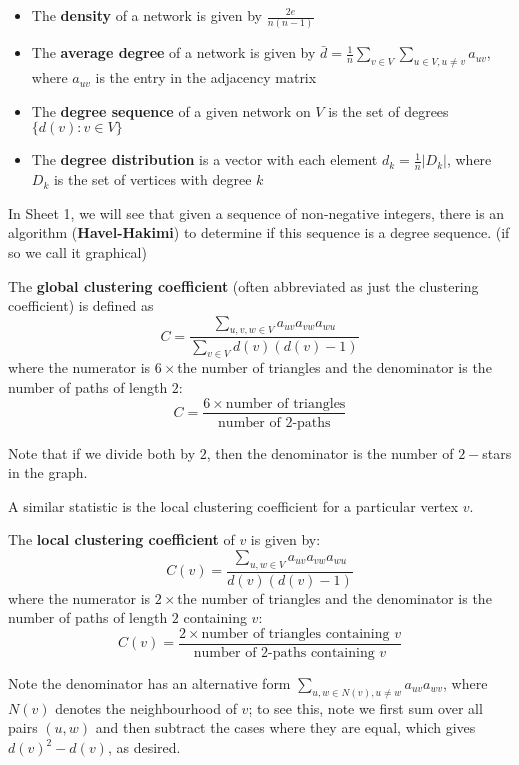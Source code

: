 \documentclass{article}
\begin{document}
\begin{itemize}
    \item  The \textbf{density} of a network is given by $\frac{2e}{n(n-1)}$
    \item The \textbf{average degree} of a network is given by $\bar{d}=\frac{1}{n}\sum_{v\in V} \sum_{u\in V, u\neq v} a_{uv}$, where $a_{uv}$ is the entry in the adjacency matrix
    \item The \textbf{degree sequence} of a given network on $V$ is the set of degrees $\{d(v): v\in V\}$
    \item The \textbf{degree distribution} is a vector with each element $d_k=\frac{1}{n} |D_k|$, where $D_k$ is the set of vertices with degree $k$
\end{itemize}
\begin{remark}
    In Sheet 1, we will see that given a sequence of non-negative integers, there is an algorithm (\textbf{Havel-Hakimi}) to determine if this sequence is a degree sequence. (if so we call it graphical)
\end{remark}

\begin{definition}
    The \textbf{global clustering coefficient} (often abbreviated as just the clustering coefficient) is defined as
    \begin{equation*}
        C = \frac{\sum_{u,v,w \in V} a_{uv}a_{vw}a_{wu}}{\sum_{v \in V} d(v)(d(v)-1)}
    \end{equation*}
    where the numerator is $6\times$the number of triangles and the denominator is the number of paths of length $2$:
    \[
        C = \frac{6\times \text{number of triangles}}{\text{number of 2-paths}}
    \]
\end{definition}

 Note that if we divide both by $2$, then the denominator is the number of $2-$stars in the graph.

A similar statistic is the local clustering coefficient for a particular vertex $v$.

\begin{definition}
    The \textbf{local clustering coefficient} of $v$ is given by:
    \begin{equation*}
        C(v) =  \frac{\sum_{u,w \in V} a_{uv}a_{vw}a_{wu}}{d(v)(d(v)-1)}
    \end{equation*}
    where the numerator is $2\times$the number of triangles and the denominator is the number of paths of length $2$ containing $v$:
    \[
        C(v) = \frac{2\times \text{number of triangles containing } v}{\text{number of 2-paths containing }v}
    \]
\end{definition}
Note the denominator has an alternative form $\sum_{u, w \in N(v), u\neq w} a_{uv}a_{wv}$, where $N(v)$ denotes the neighbourhood of $v$; to see this, note we first sum over all pairs $(u,w)$ and then subtract the cases where they are equal, which gives $d(v)^2-d(v)$, as desired.
\end{document}
